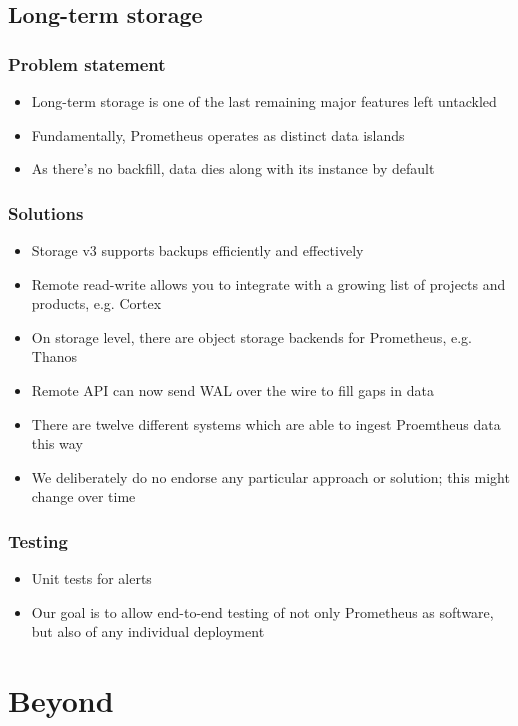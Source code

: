 \documentclass[aspectratio=169]{beamer}
\begin{document}
\subsection{Long-term storage}

\begin{frame}
	\frametitle{Problem statement}
	\begin{itemize}
		\item Long-term storage is one of the last remaining major features left untackled
		\item Fundamentally, Prometheus operates as distinct data islands
		\item As there's no backfill, data dies along with its instance by default
	\end{itemize}
\end{frame}

\begin{frame}
	\frametitle{Solutions}
	\begin{itemize}
		\item Storage v3 supports backups efficiently and effectively
		\item Remote read-write allows you to integrate with a growing list of projects and products, e.g. Cortex
		\item On storage level, there are object storage backends for Prometheus, e.g. Thanos
		\item Remote API can now send WAL over the wire to fill gaps in data
		\item There are twelve different systems which are able to ingest Proemtheus data this way
		\item We deliberately do no endorse any particular approach or solution; this might change over time
	\end{itemize}
\end{frame}

\begin{frame}
	\frametitle{Testing}
	\begin{itemize}
		\item Unit tests for alerts
		\item Our goal is to allow end-to-end testing of not only Prometheus as software, but also of any individual deployment
	\end{itemize}
\end{frame}

\section{Beyond}
\end{document}
